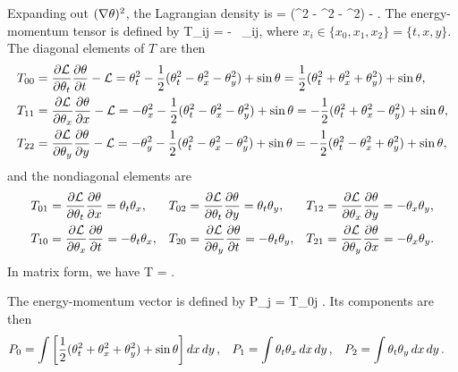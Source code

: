 \begin{solution}
	Expanding out $(\nabla\theta)^2$, the Lagrangian density is
	\beqn \label{lagr3}
		\Ld =  (\thtt^2 - \thtx^2 - \thty^2) - \sint.
	\eeqn
	The energy-momentum tensor is defined by
	\beq
		T_{ij} =   - \Ld \, \delta_{ij},
	\eeq
	where $x_i \in \{ x_0, x_1, x_2 \} = \{ t, x, y \}$.  The diagonal elements of $T$ are then
	\begin{align*}
		T_{00} &= \pdv{\mathcal{L}}{\theta_t} \pdv{\theta}{t} - \mathcal{L} = \theta_t^2 - \frac{1}{2} (\theta_t^2 - \theta_x^2 - \theta_y^2) + \sin{\theta} = \frac{1}{2} (\theta_t^2 + \theta_x^2 + \theta_y^2) + \sin{\theta}, \\
		T_{11} &= \pdv{\mathcal{L}}{\theta_x} \pdv{\theta}{x} - \mathcal{L} = -\theta_x^2 - \frac{1}{2} (\theta_t^2 - \theta_x^2 - \theta_y^2) + \sin{\theta} = -\frac{1}{2} (\theta_t^2 + \theta_x^2 - \theta_y^2) + \sin{\theta}, \\
		T_{22} &= \pdv{\mathcal{L}}{\theta_y} \pdv{\theta}{y} - \mathcal{L} = -\theta_y^2 - \frac{1}{2} (\theta_t^2 - \theta_x^2 - \theta_y^2) + \sin{\theta} = -\frac{1}{2} (\theta_t^2 - \theta_x^2 + \theta_y^2) + \sin{\theta},
	\end{align*}
	and the nondiagonal elements are
	\begin{align*}
		T_{01} &= \pdv{\mathcal{L}}{\theta_t} \pdv{\theta}{x} = \theta_t \theta_x, &
		T_{02} &= \pdv{\mathcal{L}}{\theta_t} \pdv{\theta}{y} = \theta_t \theta_y, &
		T_{12} &= \pdv{\mathcal{L}}{\theta_x} \pdv{\theta}{y} = -\theta_x \theta_y, \\
		T_{10} &= \pdv{\mathcal{L}}{\theta_x} \pdv{\theta}{t} = -\theta_t \theta_x, &
		T_{20} &= \pdv{\mathcal{L}}{\theta_y} \pdv{\theta}{t} = -\theta_t \theta_y, &
		T_{21} &= \pdv{\mathcal{L}}{\theta_y} \pdv{\theta}{x} = -\theta_x \theta_y.
	\end{align*}
	In matrix form, we have
	\beq
		T = .
	\eeq
	
	The energy-momentum vector is defined by
	\beq
		P_j = \int T_{0j}  .
	\eeq
	Its components are then
	\begin{align*}
		P_0 &= \int \left[ \frac{1}{2} (\theta_t^2 + \theta_x^2 + \theta_y^2) + \sin{\theta} \right] \dd{x} \dd{y}, &
		P_1 &= \int \theta_t \theta_x \dd{x} \dd{y}, &
		P_2 &= \int \theta_t \theta_y \dd{x} \dd{y}.
	\end{align*}
\end{solution}